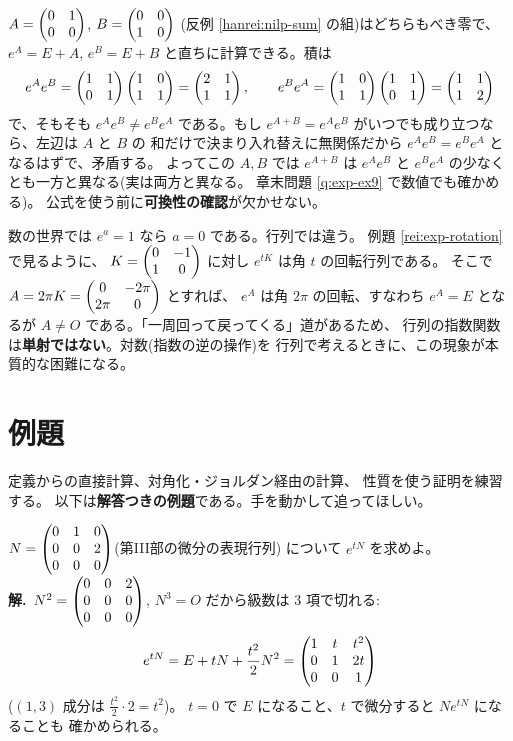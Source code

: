 \begin{hanrei}\label{hanrei:exp-product}
$A = \begin{pmatrix}0 & 1 \\ 0 & 0\end{pmatrix}$, $B = \begin{pmatrix}0 & 0 \\ 1 & 0\end{pmatrix}$
(反例 \ref{hanrei:nilp-sum} の組)はどちらもべき零で、
$e^{A} = E + A$, $e^{B} = E + B$ と直ちに計算できる。積は
\[
e^{A}e^{B} = \begin{pmatrix}1 & 1 \\ 0 & 1\end{pmatrix}\begin{pmatrix}1 & 0 \\ 1 & 1\end{pmatrix} = \begin{pmatrix}2 & 1 \\ 1 & 1\end{pmatrix},
\qquad
e^{B}e^{A} = \begin{pmatrix}1 & 0 \\ 1 & 1\end{pmatrix}\begin{pmatrix}1 & 1 \\ 0 & 1\end{pmatrix} = \begin{pmatrix}1 & 1 \\ 1 & 2\end{pmatrix}
\]
で、そもそも $e^{A}e^{B} \neq e^{B}e^{A}$ である。もし
$e^{A+B} = e^{A}e^{B}$ がいつでも成り立つなら、左辺は $A$ と $B$ の
和だけで決まり入れ替えに無関係だから
$e^{A}e^{B} = e^{B}e^{A}$ となるはずで、矛盾する。
よってこの $A, B$ では $e^{A+B}$ は $e^{A}e^{B}$ と
$e^{B}e^{A}$ の少なくとも一方と異なる(実は両方と異なる。
章末問題 \ref{q:exp-ex9} で数値でも確かめる)。
公式を使う前に\textbf{可換性の確認}が欠かせない。
\end{hanrei}

\begin{hanrei}[$e^{A} = E$ でも $A = O$ とは限らない]\label{hanrei:exp-identity}
数の世界では $e^a = 1$ なら $a = 0$ である。行列では違う。
例題 \ref{rei:exp-rotation} で見るように、
$K = \begin{pmatrix}0 & -1 \\ 1 & 0\end{pmatrix}$ に対し $e^{tK}$ は角 $t$ の回転行列である。
そこで $A = 2\pi K = \begin{pmatrix}0 & -2\pi \\ 2\pi & 0\end{pmatrix}$ とすれば、
$e^{A}$ は角 $2\pi$ の回転、すなわち $e^{A} = E$ となるが
$A \neq O$ である。「一周回って戻ってくる」道があるため、
行列の指数関数は\textbf{単射ではない}。対数(指数の逆の操作)を
行列で考えるときに、この現象が本質的な困難になる。
\end{hanrei}

\section{例題}

定義からの直接計算、対角化・ジョルダン経由の計算、
性質を使う証明を練習する。
以下は\textbf{解答つきの例題}である。手を動かして追ってほしい。

\begin{rei}\label{rei:exp-nilp}
$N = \begin{pmatrix}0 & 1 & 0 \\ 0 & 0 & 2 \\ 0 & 0 & 0\end{pmatrix}$(第III部の微分の表現行列)
について $e^{tN}$ を求めよ。\\
\textbf{解.}\ $N^2 = \begin{pmatrix}0 & 0 & 2 \\ 0 & 0 & 0 \\ 0 & 0 & 0\end{pmatrix}$,
$N^3 = O$ だから級数は $3$ 項で切れる:
\[
e^{tN} = E + tN + \frac{t^2}{2}N^2
= \begin{pmatrix}1 & t & t^2 \\ 0 & 1 & 2t \\ 0 & 0 & 1\end{pmatrix}
\]
($(1,3)$ 成分は $\frac{t^2}{2} \cdot 2 = t^2$)。
$t = 0$ で $E$ になること、$t$ で微分すると $N e^{tN}$ になることも
確かめられる。
\end{rei}

